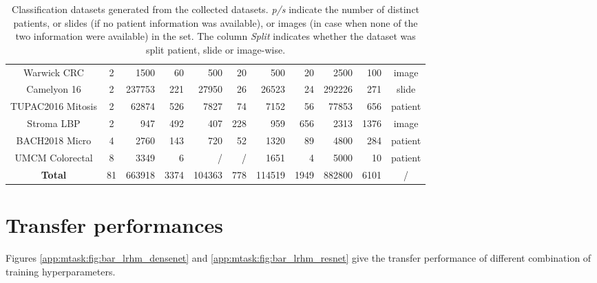 \begin{table}[t]
\begin{tabular}{|c|c|r:r|r:r|r:r|r:r|c|}
Warwick CRC & 2 & 1500 & 60 & 500 & 20 & 500 & 20 & 2500 & 100 & image \\
Camelyon 16 & 2 & 237753 & 221 & 27950 & 26 & 26523 & 24 & 292226 & 271 & slide\\
TUPAC2016 Mitosis & 2 & 62874 & 526 & 7827 & 74 & 7152 & 56 & 77853 & 656 & patient \\
Stroma LBP & 2 & 947 & 492 & 407 & 228 & 959 & 656 & 2313 & 1376 & image \\
BACH2018 Micro & 4 & 2760 & 143 & 720 & 52 & 1320 & 89 & 4800 & 284 & patient \\
UMCM Colorectal & 8 & 3349 & 6 & / & / & 1651 & 4 & 5000 & 10 & patient \\
\hline
\textbf{Total} & 81 & 663918 & 3374 & 104363 & 778 & 114519 & 1949 & 882800 & 6101 & / \\
\hline
    \end{tabular}
    
    \caption{Classification datasets generated from the collected datasets. \textit{p/s} indicate the number of distinct patients, or slides (if no patient information was available), or images (in case when none of the two information were available) in the set. The column \textit{Split} indicates whether the dataset was split patient, slide or image-wise.}
    \label{app:mtask:tab:final_datasets}
\end{table}

\section{Transfer performances}
\label{app:mtask:sec:transfer_perf}

Figures \ref{app:mtask:fig:bar_lrhm_densenet} and \ref{app:mtask:fig:bar_lrhm_resnet} give the transfer performance of different combination of training hyperparameters.






